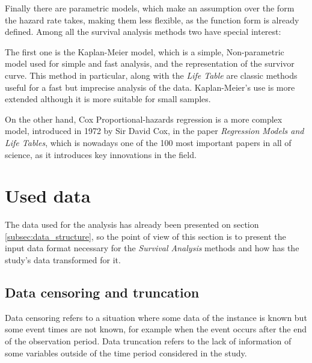 \documentclass[11pt]{book} %
\begin{document}
    Finally there are parametric models, which make an assumption over the form the hazard rate takes, making them less flexible, as the function form is already defined. Among all the survival analysis methods two have special interest:

    The first one is the Kaplan-Meier model, which is a simple, Non-parametric model used for simple and fast analysis, and the representation of the survivor curve. This method in particular, along with the \emph{Life Table} are classic methods useful for a fast but imprecise analysis of the data. Kaplan-Meier's use is more extended although it is more suitable for small samples.

    On the other hand, Cox Proportional-hazards regression is a more complex model, introduced in 1972 by Sir David Cox, in the paper \emph{Regression Models and Life Tables}, which is nowadays one of the 100 most important papers in all of science, as it introduces key innovations in the field.

  \section{Used data}

    The data used for the analysis has already been presented on section \ref{subsec:data_structure}, so the point of view of this section is to present the input data format necessary for the \emph{Survival Analysis} methods and how has the study's data transformed for it.

    \subsection{Data censoring and truncation}
      \label{subsubsec:censoring}

      Data censoring refers to a situation where some data of the instance is known but some event times are not known, for example when the event occurs after the end of the observation period. Data truncation refers to the lack of information of some variables outside of the time period considered in the study.
\end{document}
